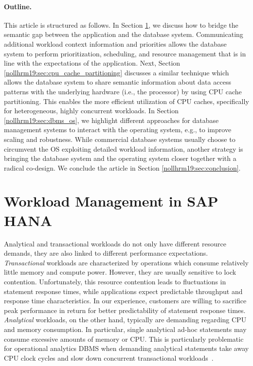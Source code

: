 \documentclass[11pt]{article}
\begin{document}
\paragraph{Outline.}
This article is structured as follows.
In Section \ref{nollhrm19:sec:hana_wlm}, we discuss how to bridge the semantic gap between the application and the database system.
Communicating additional workload context information and priorities allows the database system to perform prioritization, scheduling, and resource management that is in line with the expectations of the application.
Next, Section \ref{nollhrm19:sec:cpu_cache_partitioning} discusses a similar technique which allows the database system to share semantic information about data access patterns with the underlying hardware (i.e., the processor) by using CPU cache partitioning.
This enables the more efficient utilization of CPU caches, specifically for heterogeneous, highly concurrent workloads.
In Section \ref{nollhrm19:sec:dbms_os}, we highlight different approaches for database management systems to interact with the operating system, e.g., to improve scaling and robustness.
While commercial database systems usually choose to circumvent the OS exploiting detailed workload information, another strategy is bringing the database system and the operating system closer together with a radical co-design.
We conclude the article in Section \ref{nollhrm19:sec:conclusion}.



\section{Workload Management in SAP HANA}
\label{nollhrm19:sec:hana_wlm}

Analytical and transactional workloads do not only have different resource demands, they are also linked to different performance expectations.
\emph{Transactional} workloads are characterized by operations which consume relatively little memory and compute power.
However, they are usually sensitive to lock contention.
Unfortunately, this resource contention leads to fluctuations in statement response times, while applications expect predictable throughput and response time characteristics.
In our experience, customers are willing to sacrifice peak performance in return for better predictability of statement response times.
\emph{Analytical} workloads, on the other hand, typically are demanding regarding CPU and memory consumption.
In particular, single analytical ad-hoc statements may consume excessive amounts of memory or CPU.
This is particularly problematic for operational analytics DBMS when demanding analytical statements take away CPU clock cycles and slow down concurrent transactional workloads~\cite{nollhrm19:Wolf:2014:SUM}.
\end{document}
